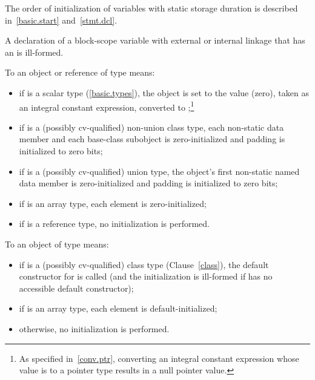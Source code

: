 \pnum
The order of initialization of variables with static storage duration is described in~\ref{basic.start}
and~\ref{stmt.dcl}.
\exitnote

\pnum
A declaration of a block-scope variable with external or internal
linkage that has an  is ill-formed.

\pnum
{}%
%
%
%
To
an object or reference of type
means:

\begin{itemize}
\item
if
is a scalar type (\ref{basic.types}), the
object
is set to the value
(zero), taken as an integral constant expression, converted to
;\footnote{As specified in~\ref{conv.ptr}, converting an integral
constant expression whose value is
to a pointer type results in a null pointer value.
}

\item
if
is a (possibly cv-qualified) non-union class type,
each non-static data member and each
base-class subobject is zero-initialized and padding is initialized to zero bits;

\item
if
is a (possibly cv-qualified) union type,
the
object's first non-static named
data member
is zero-initialized and padding is initialized to zero bits;

\item
if
is an array type,
each element is zero-initialized;
\item
if
is a reference type, no initialization is performed.
\end{itemize}

\pnum
{}%
To
an object of type
means:

\begin{itemize}
\item
if
is a (possibly cv-qualified) class type (Clause~\ref{class}), the default constructor for
is called (and the initialization is ill-formed if
has no accessible default constructor);

\item
if
is an array type, each element is default-initialized;

\item
otherwise,
no initialization is performed.
\end{itemize}

